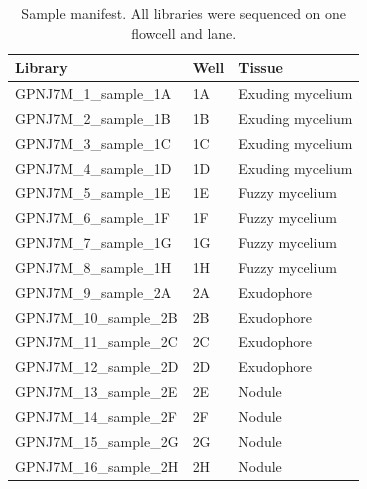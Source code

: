\begin{table}[htbp]
\caption{Sample manifest. All libraries were sequenced on one flowcell and lane.}\label{tab:s1}
\footnotesize
\begin{tabular}{@{}lll@{}}
\toprule
Library & Well & Tissue \\
\midrule
GPNJ7M\_1\_sample\_1A & 1A & Exuding mycelium \\
GPNJ7M\_2\_sample\_1B & 1B & Exuding mycelium \\
GPNJ7M\_3\_sample\_1C & 1C & Exuding mycelium \\
GPNJ7M\_4\_sample\_1D & 1D & Exuding mycelium \\
GPNJ7M\_5\_sample\_1E & 1E & Fuzzy mycelium \\
GPNJ7M\_6\_sample\_1F & 1F & Fuzzy mycelium \\
GPNJ7M\_7\_sample\_1G & 1G & Fuzzy mycelium \\
GPNJ7M\_8\_sample\_1H & 1H & Fuzzy mycelium \\
GPNJ7M\_9\_sample\_2A & 2A & Exudophore \\
GPNJ7M\_10\_sample\_2B & 2B & Exudophore \\
GPNJ7M\_11\_sample\_2C & 2C & Exudophore \\
GPNJ7M\_12\_sample\_2D & 2D & Exudophore \\
GPNJ7M\_13\_sample\_2E & 2E & Nodule \\
GPNJ7M\_14\_sample\_2F & 2F & Nodule \\
GPNJ7M\_15\_sample\_2G & 2G & Nodule \\
GPNJ7M\_16\_sample\_2H & 2H & Nodule \\
\bottomrule
\end{tabular}
\end{table}
